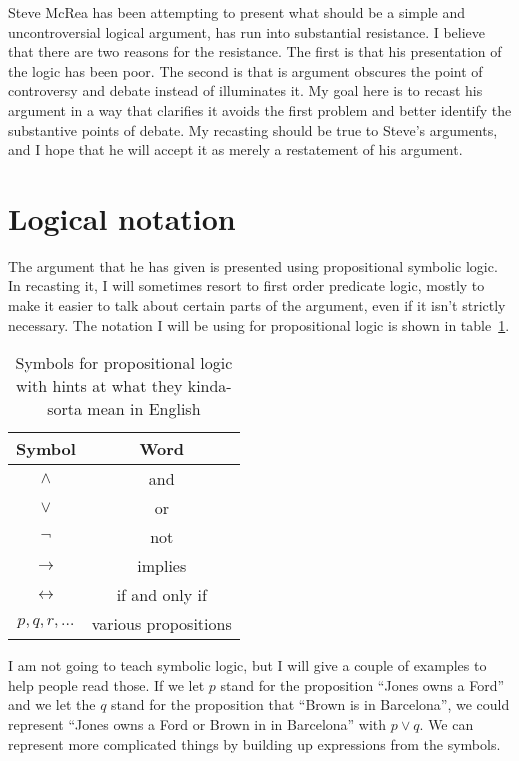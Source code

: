 \documentclass[12pt]{article}
\providecommand{\land}{\wedge}
\providecommand{\lor}{\vee}
\providecommand{\lif}{\rightarrow}
\providecommand{\liff}{\leftrightarrow}
\providecommand{\lnot}{\neg}
\begin{document}
Steve McRea has been attempting to present what should be a simple and uncontroversial logical argument, has run into substantial resistance.
I believe that there are two reasons for the resistance. The first is that his presentation of the logic has been poor. The second is that is argument obscures the point of controversy and debate instead of illuminates it.
My goal here is to recast his argument in a way that clarifies it avoids the first problem and better identify the substantive points of debate.
My recasting should be true to Steve's arguments, and I hope that he will accept it as merely a restatement of his argument.

\section{Logical notation}

The argument that he has given is presented using propositional symbolic logic.
In recasting it, I will sometimes resort to first order predicate logic, mostly to make it easier to talk about certain parts of the argument, even if it isn't strictly necessary. The notation I will be using for propositional logic is shown in table~\ref{tab:prop}. 

\begin{table}
    \begin{center}
    \begin{tabular}{cc}
        \toprule
        Symbol & Word \\
        \midrule
        $\land$ & and \\
        $\lor$  &  or \\
        $\lnot$ & not \\
        $\lif$  & implies \\
        $\liff$ & if and only if \\
        $p, q, r, \dots$ & various propositions \\
        \bottomrule  
    \end{tabular}
    \caption[Propositional logic symbols]{Symbols for propositional logic with hints at what they kinda-sorta mean in English}\label{tab:prop}
    \end{center}
\end{table}

I am not going to teach symbolic logic, but I will give a couple of examples to help people read those. If we let $p$ stand for the proposition “Jones owns a Ford” and we let the $q$ stand for the proposition that “Brown is in Barcelona”, we could represent “Jones owns a Ford or Brown in in Barcelona” with $p \lor q$.
We can represent more complicated things by building up expressions from the symbols.
\end{document}
